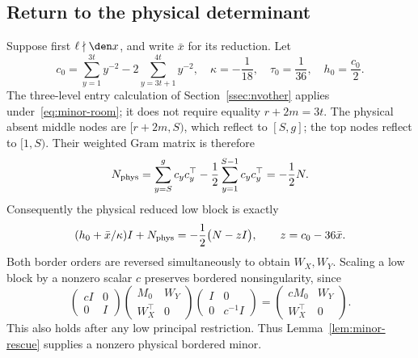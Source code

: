 \subsection{Return to the physical determinant}
Suppose first $\ell\nmid\den x$, and write $\bar x$ for its reduction.
Let
\[
 c_0=\sum_{y=1}^{3t}y^{-2}-2\sum_{y=3t+1}^{4t}y^{-2},\quad
 \kappa=-\frac1{18},\quad \tau_0=\frac1{36},\quad h_0=\frac{c_0}{2}.
\]
The three-level entry calculation of Section~\ref{ssec:nvother} applies
under~\eqref{eq:minor-room}; it does not require equality $r+2m=3t$.
The physical absent middle nodes are $[r+2m,S)$, which reflect to $[S,g]$;
the top nodes reflect to $[1,S)$. Their weighted Gram matrix is therefore
\[
 N_{\rm phys}=\sum_{y=S}^{g}c_yc_y^{\top}
              -\frac12\sum_{y=1}^{S-1}c_yc_y^{\top}=-\frac12 N.
\]
Consequently the physical reduced low block is exactly
\begin{equation}\label{eq:minor-physical}
 (h_0+\bar x/\kappa)I+N_{\rm phys}
       =-\frac12\bigl(N-zI\bigr),\qquad z=c_0-36\bar x.
\end{equation}
Both border orders are reversed simultaneously to obtain $W_X,W_Y$.
Scaling a low block by a nonzero scalar $c$ preserves bordered
nonsingularity, since
\[
 \begin{pmatrix}cI&0\\0&I\end{pmatrix}
 \begin{pmatrix}M_0&W_Y\\W_X^{\top}&0\end{pmatrix}
 \begin{pmatrix}I&0\\0&c^{-1}I\end{pmatrix}
 =\begin{pmatrix}cM_0&W_Y\\W_X^{\top}&0\end{pmatrix}.
\]
This also holds after any low principal restriction. Thus
Lemma~\ref{lem:minor-rescue} supplies a nonzero physical bordered minor.

